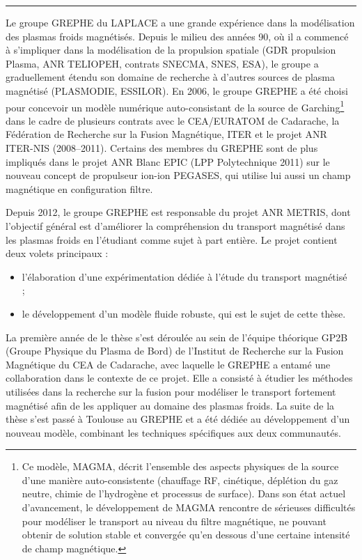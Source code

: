\begin{refsection}
\begin{center}
\rule{0.6\textwidth}{1pt}
\end{center}

Le groupe GREPHE du LAPLACE a une grande expérience dans la modélisation des
plasmas froids magnétisés. Depuis le milieu des années 90, où il a commencé 
à s'impliquer dans la modélisation de la propulsion spatiale (GDR propulsion
Plasma, ANR TELIOPEH, contrats SNECMA, SNES, ESA), le groupe a graduellement
étendu son domaine de recherche à d'autres sources de plasma magnétisé
(PLASMODIE, ESSILOR). En 2006, le groupe GREPHE
a été choisi pour concevoir un modèle numérique auto-consistant de la source de
Garching\footnote{Ce modèle, MAGMA, décrit l'ensemble des aspects
physiques de la source d'une manière auto-consistente (chauffage RF, cinétique,
déplétion du gaz neutre, chimie de l'hydrogène et processus de surface). Dans
son état actuel d'avancement, le développement de MAGMA rencontre de sérieuses
difficultés pour modéliser le transport au niveau du filtre magnétique, ne
pouvant obtenir de solution stable et convergée qu'en dessous d'une certaine
intensité de champ magnétique.} dans le cadre de plusieurs contrats avec le CEA/EURATOM de
Cadarache, la Fédération de Recherche sur la Fusion Magnétique, ITER et le
projet ANR ITER-NIS (2008--2011). Certains des membres du GREPHE sont de plus
impliqués dans le projet ANR Blanc EPIC (LPP Polytechnique 2011) sur le nouveau
concept de propulseur ion-ion PEGASES, qui utilise lui aussi un
champ magnétique en configuration filtre. 

Depuis 2012, le groupe GREPHE est responsable du projet ANR METRIS, dont
l'objectif général est d'améliorer la compréhension du transport magnétisé dans
les plasmas froids en l'étudiant comme sujet à part entière. Le projet
contient deux volets principaux :

\begin{itemize}
  \item l'élaboration d'une expérimentation dédiée à l'étude du transport
magnétisé~\parencite{Baude} ;
\item le développement d'un modèle fluide robuste, qui est
le sujet de cette thèse.
\end{itemize}
 
 La première année de
 le thèse s'est déroulée au sein de l'équipe théorique GP2B (Groupe Physique du Plasma de Bord) de l'Institut de
 Recherche sur la Fusion Magnétique du CEA de Cadarache, avec laquelle le GREPHE
 a entamé une collaboration dans le contexte de ce projet. Elle a consisté à
 étudier les méthodes utilisées dans la recherche
 sur la fusion pour modéliser le transport fortement magnétisé afin de les
 appliquer au domaine des plasmas froids. La suite de la thèse s'est passé à
 Toulouse au GREPHE et a été dédiée au développement d'un nouveau modèle,
 combinant les techniques spécifiques aux deux communautés.
 

\end{refsection}
